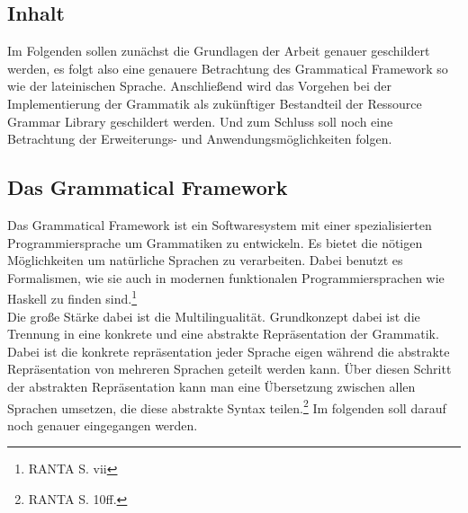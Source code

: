 \documentclass[draft,11pt]{scrartcl}
\begin{document}
\subsection{Inhalt}
Im Folgenden sollen zunächst die Grundlagen der Arbeit genauer geschildert werden, es folgt also eine genauere Betrachtung des Grammatical Framework so wie der lateinischen Sprache. Anschließend wird das Vorgehen bei der Implementierung der Grammatik als zukünftiger Bestandteil der Ressource Grammar Library geschildert werden. Und zum Schluss soll noch eine Betrachtung der Erweiterungs- und Anwendungsmöglichkeiten folgen.
\subsection{Das Grammatical Framework}
Das Grammatical Framework ist ein Softwaresystem mit einer spezialisierten Programmiersprache um Grammatiken zu entwickeln. Es bietet die nötigen Möglichkeiten um natürliche Sprachen zu verarbeiten. Dabei benutzt es Formalismen, wie sie auch in modernen funktionalen Programmiersprachen wie Haskell zu finden sind.\footnote{RANTA S. vii} \\ 
Die große Stärke dabei ist die Multilingualität. Grundkonzept dabei ist die Trennung in eine konkrete und eine abstrakte Repräsentation der Grammatik. Dabei ist die konkrete repräsentation jeder Sprache eigen während die abstrakte Repräsentation von mehreren Sprachen geteilt werden kann. Über diesen Schritt der abstrakten Repräsentation kann man eine Übersetzung zwischen allen Sprachen umsetzen, die diese abstrakte Syntax teilen.\footnote{RANTA S. 10ff.} Im folgenden soll darauf noch genauer eingegangen werden.
\end{document}
